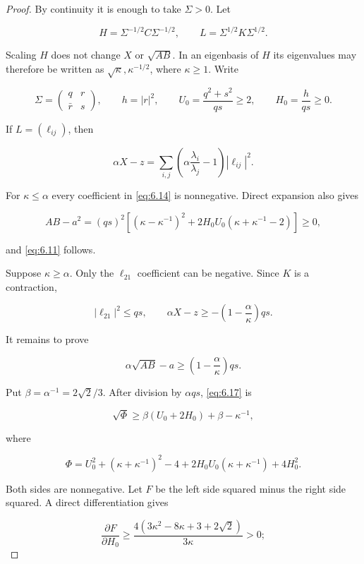 \documentclass[11pt]{article}
\begin{document}
\begin{proof}
By continuity it is enough to take $\Sigma>0$. Let

\[
H=\Sigma^{-1/2}C\Sigma^{-1/2},\qquad
L=\Sigma^{1/2}K\Sigma^{1/2}.
\tag{6.12}\label{eq:6.12}
\]

Scaling $H$ does not change $X$ or $\sqrt{AB}$. In an eigenbasis of $H$ its
eigenvalues may therefore be written as $\sqrt\kappa,\kappa^{-1/2}$, where
$\kappa\ge1$. Write

\[
\Sigma=\begin{pmatrix}q&r\\\bar r&s\end{pmatrix},\qquad h=|r|^2,
\qquad U_0=\frac{q^2+s^2}{qs}\ge2,\qquad H_0=\frac h{qs}\ge0.
\tag{6.13}\label{eq:6.13}
\]

If $L=(\ell_{ij})$, then

\[
\alpha X-z
=\sum_{i,j}\left(\alpha\frac{\lambda_i}{\lambda_j}-1\right)
|\ell_{ij}|^2.
\tag{6.14}\label{eq:6.14}
\]

For $\kappa\le\alpha$ every coefficient in \eqref{eq:6.14} is nonnegative. Direct
expansion also gives

\[
AB-a^2=(qs)^2\left[
(\kappa-\kappa^{-1})^2+
2H_0U_0(\kappa+\kappa^{-1}-2)\right]\ge0,
\tag{6.15}\label{eq:6.15}
\]

and \eqref{eq:6.11} follows.

Suppose $\kappa\ge\alpha$. Only the $\ell_{21}$ coefficient can be negative.
Since $K$ is a contraction,

\[
|\ell_{21}|^2\le qs,
\qquad
\alpha X-z\ge-\left(1-\frac\alpha\kappa\right)qs.
\tag{6.16}\label{eq:6.16}
\]

It remains to prove

\[
\alpha\sqrt{AB}-a\ge
\left(1-\frac\alpha\kappa\right)qs.
\tag{6.17}\label{eq:6.17}
\]

Put $\beta=\alpha^{-1}=2\sqrt2/3$. After division by $\alpha qs$, \eqref{eq:6.17}
is

\[
\sqrt\Phi\ge\beta(U_0+2H_0)+\beta-\kappa^{-1},
\tag{6.18}\label{eq:6.18}
\]

where

\[
\Phi=U_0^2+(\kappa+\kappa^{-1})^2-4
+2H_0U_0(\kappa+\kappa^{-1})+4H_0^2.
\tag{6.19}\label{eq:6.19}
\]

Both sides are nonnegative. Let $F$ be the left side squared minus the right
side squared. A direct differentiation gives

\[
\frac{\partial F}{\partial H_0}\ge
\frac{4(3\kappa^2-8\kappa+3+2\sqrt2)}{3\kappa}>0;
\tag{6.20}\label{eq:6.20}
\]


\end{proof}
\end{document}
